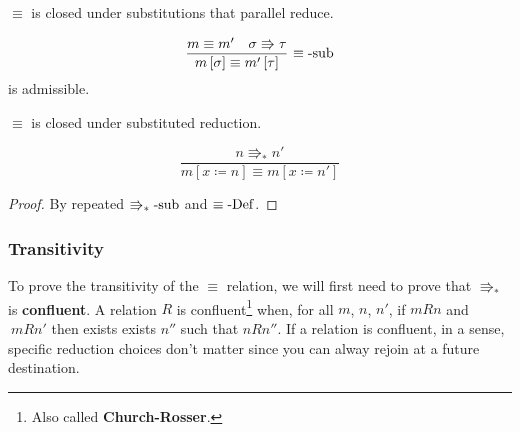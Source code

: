 \begin{lem}
$\equiv$ is closed under substitutions that parallel reduce.

\[
\frac{m\equiv m'\quad\sigma\Rrightarrow\tau}{m\left[\sigma\right]\equiv m'\left[\tau\right]}\,\operatorname{\equiv-sub}
\]
is admissible.
\end{lem}
 
\begin{cor}
$\equiv$ is closed under substituted reduction.

\[
\frac{n\Rrightarrow_{\ast}n'}{m\left[x\coloneqq n\right]\equiv m\left[x\coloneqq n'\right]}
\]
\end{cor}
\begin{proof}
By repeated $\operatorname{\Rrightarrow_{\ast}-sub}$ and $\equiv\operatorname{-Def}$.
\end{proof}
 
\subsubsection{Transitivity}
 
To prove the transitivity of the $\equiv$ relation, we will first need to prove that \textbf{$\Rrightarrow_{\ast}$ }is \textbf{confluent}.
A relation $R$ is confluent\footnote{
  Also called \textbf{Church-Rosser}.
} when, for all $m$, $n$, $n'$, if $mRn$ and $\:mRn'$ then exists exists $n''$ such that $nRn''$. %
If a relation is confluent, in a sense, specific reduction choices don't matter since you can alway rejoin at a future destination.
 
